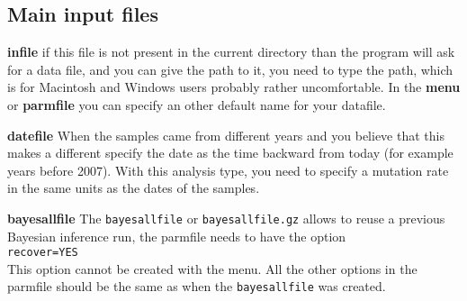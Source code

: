 \subsection{Main input files}
\begin{description}
\item{\bf infile} if this file is not present in the current directory 
than the program will ask for a data file, and you can
give the path to it, you need to type the path, which is for Macintosh and Windows users probably rather uncomfortable. In the {\bf menu} or {\bf parmfile} you can specify an other default name for your datafile. 
\item{\bf datefile} When the samples came from different years and you believe that this makes a different specify the date as the time backward from today (for example years before 2007). With this analysis type, you need to specify a mutation rate in the same units as the dates of the samples.
\item{\bf bayesallfile} The  \texttt{bayesallfile}  or  \texttt{bayesallfile.gz} allows to reuse a previous Bayesian inference run, the parmfile needs to have the option \\
\texttt{recover=YES}\\
This option cannot be created with the menu.
All the other options in the parmfile should be the same as when the \texttt{bayesallfile} was created.
\end{description}
